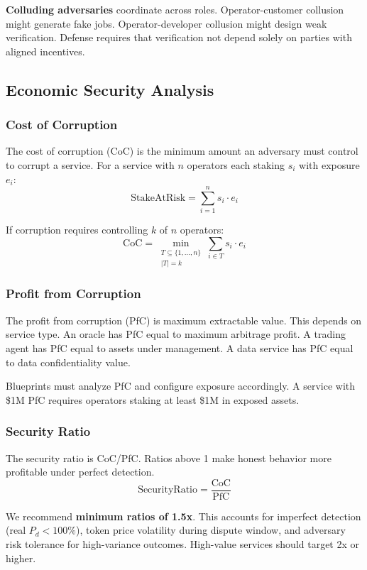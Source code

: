 \documentclass[11pt,a4paper]{article}
\begin{document}
\textbf{Colluding adversaries} coordinate across roles. Operator-customer collusion might generate fake jobs. Operator-developer collusion might design weak verification. Defense requires that verification not depend solely on parties with aligned incentives.

\subsection{Economic Security Analysis}

\subsubsection{Cost of Corruption}

The cost of corruption (CoC) is the minimum amount an adversary must control to corrupt a service. For a service with $n$ operators each staking $s_i$ with exposure $e_i$:
\[
\text{StakeAtRisk} = \sum_{i=1}^{n} s_i \cdot e_i
\]

If corruption requires controlling $k$ of $n$ operators:
\[
\text{CoC} = \min_{\substack{T \subseteq \{1,...,n\} \\ |T| = k}} \sum_{i \in T} s_i \cdot e_i
\]

\subsubsection{Profit from Corruption}

The profit from corruption (PfC) is maximum extractable value. This depends on service type. An oracle has PfC equal to maximum arbitrage profit. A trading agent has PfC equal to assets under management. A data service has PfC equal to data confidentiality value.

Blueprints must analyze PfC and configure exposure accordingly. A service with \$1M PfC requires operators staking at least \$1M in exposed assets.

\subsubsection{Security Ratio}

The security ratio is CoC/PfC. Ratios above 1 make honest behavior more profitable under perfect detection.
\[
\text{SecurityRatio} = \frac{\text{CoC}}{\text{PfC}}
\]

We recommend \textbf{minimum ratios of 1.5x}. This accounts for imperfect detection (real $P_d < 100\%$), token price volatility during dispute window, and adversary risk tolerance for high-variance outcomes. High-value services should target 2x or higher.
\end{document}
